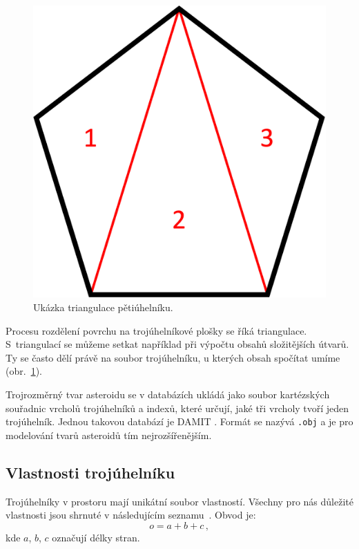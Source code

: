 \documentclass[11pt]{article}
\begin{document}
\begin{figure}[h!]
\includegraphics[scale=0.3]{figs/triangulation.png}
\centering
\caption{Ukázka triangulace pětiúhelníku.}
\label{triangulation}
\end{figure}

Procesu rozdělení povrchu na trojúhelníkové plošky se říká triangulace. S~triangulací se můžeme setkat například při výpočtu obsahů složitějších útvarů. Ty se často dělí právě na soubor trojúhelníku, u kterých obsah spočítat umíme (obr.~\ref{triangulation}). 

Trojrozměrný tvar asteroidu se v databázích ukládá jako soubor kartézských souřadnic vrcholů trojúhelníků a indexů, které určují, jaké tři vrcholy tvoří jeden trojúhelník. Jednou takovou databází je DAMIT \cite{Durech_2023A&A...675A..24D}. Formát se nazývá \verb|.obj| a je pro modelování tvarů asteroidů tím nejrozšířenějším.


\subsection{Vlastnosti trojúhelníku}

Trojúhelníky v prostoru mají unikátní soubor vlastností. Všechny pro nás důležité vlastnosti jsou shrnuté v následujícím seznamu~\cite{Rektorys_2009}.
Obvod je:
\begin{equation}
o = a + b + c\,,
\end{equation}
kde $a$, $b$, $c$ označují délky stran.
\end{document}
